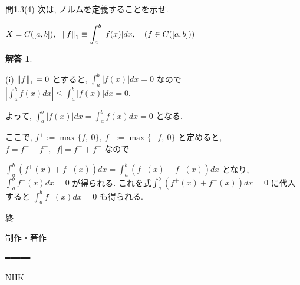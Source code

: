\documentclass{jsarticle}
\newtheorem*{answer*}{解答}
\begin{document}
\begin{itembox}[l]{問1.3(4)}
次は, ノルムを定義することを示せ.

$X = C([a,b]), \ \ \norm{f}_1 \equiv \displaystyle \int_a^b |f(x)| dx, \ \ \ (f \in C([a,b]))$
\end{itembox}

\begin{answer*}
\end{answer*}
(i) $\norm{f}_1 = 0$ とすると, $\displaystyle \int_a^b |f(x)| dx = 0$ なので$|\displaystyle \int_a^b f(x) dx | \le \displaystyle \int_a^b |f(x)| dx = 0$. 

よって, $\displaystyle \int_a^b |f(x)| dx = \int_a^b f(x) dx = 0$ となる. 

ここで, $f^+ := \max\{f, \ 0\}, \ f^- := \max\{-f, \ 0\}$ と定めると, $f = f^+ - f^-, \ |f| = f^+ + f^-$ なので

$\displaystyle \int_a^b (f^+ (x) + f^- (x)) dx = \int_a^b (f^+ (x) - f^- (x)) dx$ となり, $\displaystyle \int_a^b f^- (x) dx = 0$ が得られる. これを式$\displaystyle \int_a^b (f^+(x) + f^-(x)) dx = 0$ に代入すると $\displaystyle \int_a^b f^+ (x) dx = 0$ も得られる.

終

制作・著作

━━━━━

NHK
\end{document}

